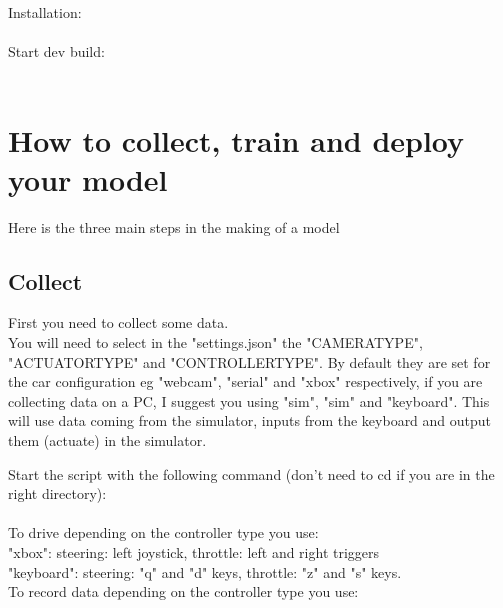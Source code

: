 \documentclass[12pt]{article}
\begin{document}
Installation:\\

\noindent{}\\

Start dev build:\\

\noindent{}\\

\section{How to collect, train and deploy your model}
Here is the three main steps in the making of a model\\

\subsection{Collect}
First you need to collect some data.\\

You will need to select in the "settings.json" the "CAMERA\textunderscore TYPE", "ACTUATOR\textunderscore TYPE" and "CONTROLLER\textunderscore TYPE". By default they are set for the car configuration eg "webcam", "serial" and "xbox" respectively, if you are collecting data on a PC, I suggest you using "sim", "sim" and "keyboard". This will use data coming from the simulator, inputs from the keyboard and output them (actuate) in the simulator.


Start the script with the following command (don't need to cd if you are in the right directory):\\

\noindent{}\\

To drive depending on the controller type you use:\\

"xbox": steering: left joystick, throttle: left and right triggers\\
    "keyboard": steering: "q" and "d" keys, throttle: "z" and "s" keys.\\


To record data depending on the controller type you use:\\
\end{document}
